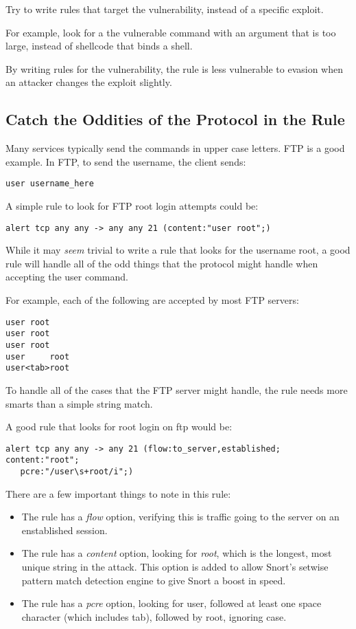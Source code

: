 \documentclass[english]{report}
\begin{document}
Try to write rules that target the vulnerability, instead of a specific exploit.

For example, look for a the vulnerable command with an argument that is too
large, instead of shellcode that binds a shell.

By writing rules for the vulnerability, the rule is less vulnerable to evasion
when an attacker changes the exploit slightly.

\subsection{Catch the Oddities of the Protocol in the Rule}

Many services typically send the commands in upper case letters.  FTP is a good example.  In FTP, to send the username, the client sends:

\begin{verbatim}
user username_here
\end{verbatim}

A simple rule to look for FTP root login attempts could be:

\begin{verbatim}
alert tcp any any -> any any 21 (content:"user root";)
\end{verbatim}

While it may \emph{seem} trivial to write a rule that looks for the username
root, a good rule will handle all of the odd things that the protocol might
handle when accepting the user command.

For example, each of the following are accepted by most FTP servers:

\begin{verbatim}
user root
user root
user root
user     root
user<tab>root
\end{verbatim}

To handle all of the cases that the FTP server might handle, the rule needs
more smarts than a simple string match.

A good rule that looks for root login on ftp would be:

\begin{verbatim}
alert tcp any any -> any 21 (flow:to_server,established; content:"root";
   pcre:"/user\s+root/i";)
\end{verbatim}

There are a few important things to note in this rule:
\begin{itemize}
\item The rule has a \emph{flow} option, verifying this is traffic going to the server on an enstablished session.
\item The rule has a \emph{content} option, looking for \emph{root}, which is
the longest, most unique string in the attack.  This option is added to allow
Snort's setwise pattern match detection engine to give Snort a boost in speed.
\item The rule has a \emph{pcre} option, looking for user, followed at least one space character (which includes tab), followed by root, ignoring case.
\end{itemize}
\end{document}
